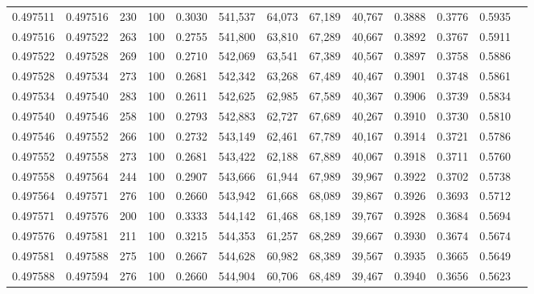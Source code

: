 \begin{tabular}{rrrrrrrrrrrrr}
0.497511 & 0.497516 &   230 & 100 &                                     0.3030 & 541,537 &  64,073 &  67,189 &  40,767 & 0.3888 & 0.3776 & 0.5935 \\
0.497516 & 0.497522 &   263 & 100 &                                     0.2755 & 541,800 &  63,810 &  67,289 &  40,667 & 0.3892 & 0.3767 & 0.5911 \\
0.497522 & 0.497528 &   269 & 100 &                                     0.2710 & 542,069 &  63,541 &  67,389 &  40,567 & 0.3897 & 0.3758 & 0.5886 \\
0.497528 & 0.497534 &   273 & 100 &                                     0.2681 & 542,342 &  63,268 &  67,489 &  40,467 & 0.3901 & 0.3748 & 0.5861 \\
0.497534 & 0.497540 &   283 & 100 &                                     0.2611 & 542,625 &  62,985 &  67,589 &  40,367 & 0.3906 & 0.3739 & 0.5834 \\
0.497540 & 0.497546 &   258 & 100 &                                     0.2793 & 542,883 &  62,727 &  67,689 &  40,267 & 0.3910 & 0.3730 & 0.5810 \\
0.497546 & 0.497552 &   266 & 100 &                                     0.2732 & 543,149 &  62,461 &  67,789 &  40,167 & 0.3914 & 0.3721 & 0.5786 \\
0.497552 & 0.497558 &   273 & 100 &                                     0.2681 & 543,422 &  62,188 &  67,889 &  40,067 & 0.3918 & 0.3711 & 0.5760 \\
0.497558 & 0.497564 &   244 & 100 &                                     0.2907 & 543,666 &  61,944 &  67,989 &  39,967 & 0.3922 & 0.3702 & 0.5738 \\
0.497564 & 0.497571 &   276 & 100 &                                     0.2660 & 543,942 &  61,668 &  68,089 &  39,867 & 0.3926 & 0.3693 & 0.5712 \\
0.497571 & 0.497576 &   200 & 100 &                                     0.3333 & 544,142 &  61,468 &  68,189 &  39,767 & 0.3928 & 0.3684 & 0.5694 \\
0.497576 & 0.497581 &   211 & 100 &                                     0.3215 & 544,353 &  61,257 &  68,289 &  39,667 & 0.3930 & 0.3674 & 0.5674 \\
0.497581 & 0.497588 &   275 & 100 &                                     0.2667 & 544,628 &  60,982 &  68,389 &  39,567 & 0.3935 & 0.3665 & 0.5649 \\
0.497588 & 0.497594 &   276 & 100 &                                     0.2660 & 544,904 &  60,706 &  68,489 &  39,467 & 0.3940 & 0.3656 & 0.5623 \\

\end{tabular}
